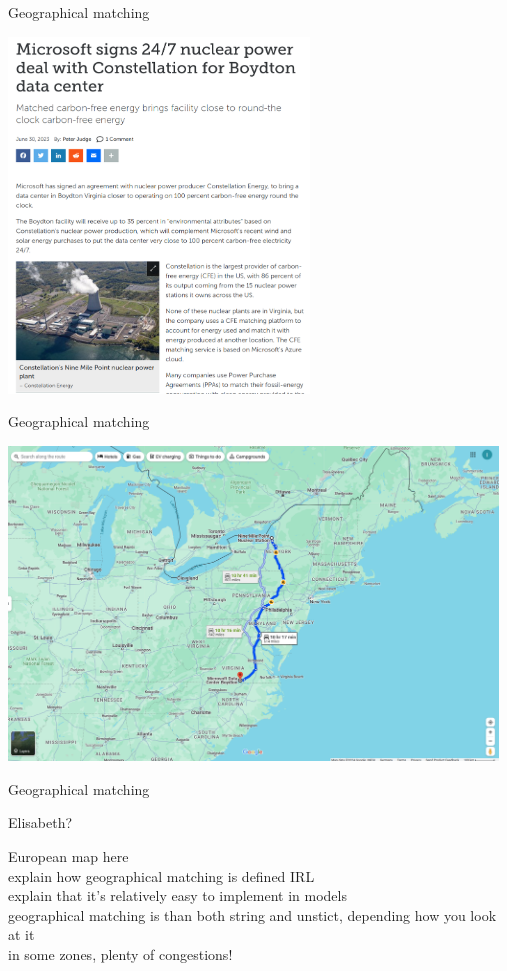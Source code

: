 \begin{frame}{Geographical matching}

  \includegraphics[width=8cm]{images/microsoft.png}

\end{frame}

\begin{frame}{Geographical matching}

  \includegraphics[width=13cm]{images/microsoft2.png}

\end{frame}
  

\begin{frame}{Geographical matching}

  Elisabeth?

  European map here\\
  explain how geographical matching is defined IRL\\
  explain that it's relatively easy to implement in models\\
  geographical matching is than both string and unstict, depending how you look at it\\
  in some zones, plenty of congestions!\\
\end{frame}

